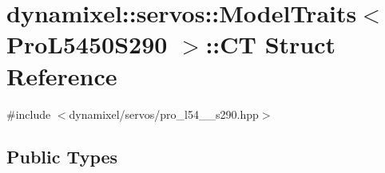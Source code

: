 \hypertarget{structdynamixel_1_1servos_1_1_model_traits_3_01_pro_l5450_s290_01_4_1_1_c_t}{}\section{dynamixel\+:\+:servos\+:\+:Model\+Traits$<$ Pro\+L5450\+S290 $>$\+:\+:CT Struct Reference}
\label{structdynamixel_1_1servos_1_1_model_traits_3_01_pro_l5450_s290_01_4_1_1_c_t}


{\ttfamily \#include $<$dynamixel/servos/pro\+\_\+l54\+\_\+\_\+s290.\+hpp$>$}

\subsection*{Public Types}

